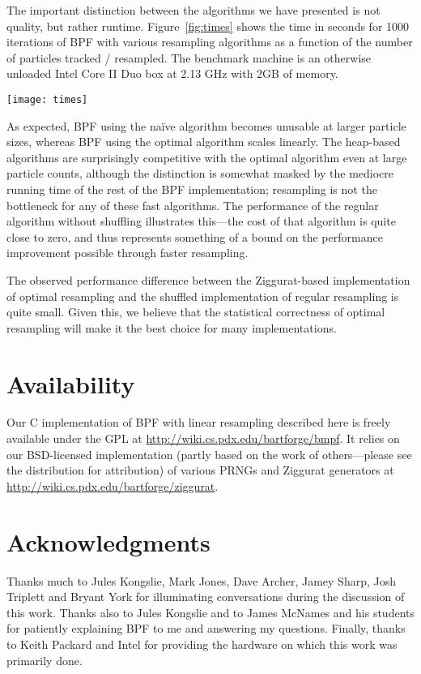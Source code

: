 \documentclass{article}
\begin{document}
  The important distinction between the algorithms we have
  presented is not quality, but rather runtime.
  Figure~\ref{fig:times} shows the time in seconds for 1000
  iterations of BPF with various resampling algorithms as a
  function of the number of particles tracked / resampled.
  The benchmark machine is an otherwise unloaded Intel Core
  II Duo box at 2.13 GHz with 2GB of memory.

  \begin{figure*}[t]
    \centering
    \texttt{[image: times]}
    \caption{Runtimes for BPF Resampling Implementations}\label{fig:times}
  \end{figure*}

  As expected, BPF using the na\"ive algorithm becomes
  unusable at larger particle sizes, whereas BPF using the
  optimal algorithm scales linearly.  The heap-based
  algorithms are surprisingly competitive with the optimal
  algorithm even at large particle counts, although the
  distinction is somewhat masked by the mediocre running
  time of the rest of the BPF implementation; resampling is
  not the bottleneck for any of these fast algorithms.  The
  performance of the regular algorithm without shuffling
  illustrates this---the cost of that algorithm is quite
  close to zero, and thus represents something of a bound on
  the performance improvement possible through faster
  resampling.

  The observed performance difference between the
  Ziggurat-based implementation of optimal resampling and
  the shuffled implementation of regular resampling is quite
  small.  Given this, we believe that the statistical
  correctness of optimal resampling will make it the best
  choice for many implementations.

\section{Availability}

  Our C implementation of BPF with linear resampling
  described here is freely available under the GPL at
  \url{http://wiki.cs.pdx.edu/bartforge/bmpf}.  It relies on
  our BSD-licensed implementation (partly based on the work
  of others---please see the distribution for attribution)
  of various PRNGs and Ziggurat generators at
  \url{http://wiki.cs.pdx.edu/bartforge/ziggurat}.

\section{Acknowledgments}

  Thanks much to Jules Kongslie, Mark Jones, Dave Archer,
  Jamey Sharp, Josh Triplett and Bryant York for
  illuminating conversations during the discussion of this
  work.  Thanks also to Jules Kongslie and to James McNames
  and his students for patiently explaining BPF to me and
  answering my questions.  Finally, thanks to Keith Packard
  and Intel for providing the hardware on which this work
  was primarily done.



\end{document}
